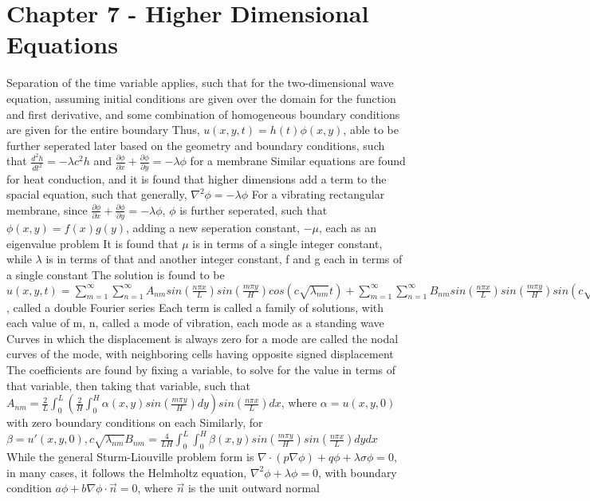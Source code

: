 \documentclass[11 pt, twoside]{article}
\newenvironment{outline*}
{
	\begin{outline}[enumerate]
	}
	{\end{outline}
}
\newcommand\pd[2]{\frac{\partial #1}{\partial #2}}
\begin{document}
\section{Chapter 7 - Higher Dimensional Equations}
\begin{outline*}
\1 Separation of the time variable applies, such that for the two-dimensional wave equation, assuming initial conditions are given over the domain for the function and first derivative, and some combination of homogeneous boundary conditions are given for the entire boundary
	\2 Thus, $u(x, y, t) = h(t)\phi(x, y)$, able to be further seperated later based on the geometry and boundary conditions, such that $\frac{d^2h}{dt^2} = -\lambda c^2h$ and $\pd{\phi}{x} + \pd{\phi}{y} = -\lambda \phi$ for a membrane
	\2 Similar equations are found for heat conduction, and it is found that higher dimensions add a term to the spacial equation, such that generally, $\nabla^2 \phi = -\lambda \phi$
\1 For a vibrating rectangular membrane, since $\pd{\phi}{x} + \pd{\phi}{y} = -\lambda \phi$, $\phi$ is further seperated, such that $\phi(x, y) = f(x)g(y)$, adding a new seperation constant, $-\mu$, each as an eigenvalue problem
	\2 It is found that $\mu$ is in terms of a single integer constant, while $\lambda$ is in terms of that and another integer constant, f and g each in terms of a single constant
	\2 The solution is found to be $u(x, y, t) = \sum_{m = 1}^{\infty} \sum_{n = 1}^{\infty} A_{nm} sin(\frac{n\pi x}{L}) sin(\frac{m\pi y}{H}) cos(c\sqrt{\lambda_{nm}}t) + \sum_{m = 1}^{\infty} \sum_{n = 1}^{\infty} B_{nm} sin(\frac{n\pi x}{L}) sin(\frac{m\pi y}{H}) sin(c\sqrt{\lambda_{nm}}t)$, called a double Fourier series
		\3 Each term is called a family of solutions, with each value of m, n, called a mode of vibration, each mode as a standing wave
		\3 Curves in which the displacement is always zero for a mode are called the nodal curves of the mode, with neighboring cells having opposite signed displacement
	\2 The coefficients are found by fixing a variable, to solve for the value in terms of that variable, then taking that variable, such that $A_{nm} = \frac{2}{L}\int^L_0 (\frac{2}{H}\int^H_0 \alpha(x, y) sin(\frac{m\pi y}{H})dy) sin(\frac{n\pi x}{L})dx$, where $\alpha = u(x, y, 0)$ with zero boundary conditions on each
		\3 Similarly, for $\beta = u'(x, y, 0), c\sqrt{\lambda_{nm}}B_{nm} = \frac{4}{LH}\int^L_0 \int_0^H \beta(x, y) sin(\frac{m\pi y}{H}) sin(\frac{n\pi x}{L})dydx$
\1 While the general Sturm-Liouville problem form is $\nabla \cdot (p\nabla \phi) + q\phi + \lambda \sigma \phi = 0$, in many cases, it follows the Helmholtz equation, $\nabla^2 \phi + \lambda \phi = 0$, with boundary condition $a\phi + b\nabla \phi \cdot \vec{n} = 0$, where $\vec{n}$ is the unit outward normal

\end{outline*}
\end{document}
